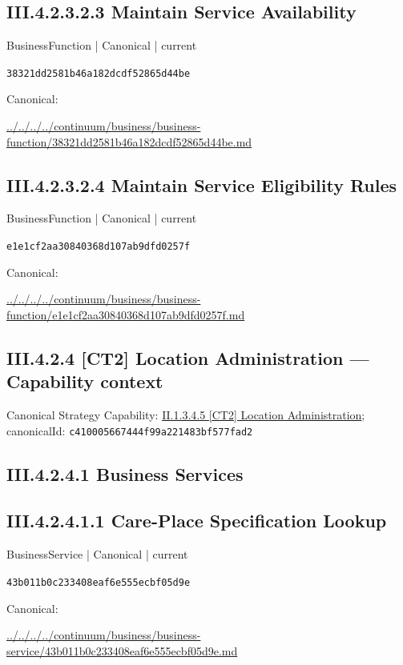\documentclass[10pt,a4paper]{article}
\begin{document}
\subsection*{III.4.2.3.2.3 Maintain Service Availability}
\label{element-38321dd2581b46a182dcdf52865d44be}
{\small BusinessFunction | Canonical | current}\par
\texttt{38321dd2581b46a182dcdf52865d44be}\par
Canonical: \par
{\footnotesize\url{../../../../continuum/business/business-function/38321dd2581b46a182dcdf52865d44be.md}}\par
\subsection*{III.4.2.3.2.4 Maintain Service Eligibility Rules}
\label{element-e1e1cf2aa30840368d107ab9dfd0257f}
{\small BusinessFunction | Canonical | current}\par
\texttt{e1e1cf2aa30840368d107ab9dfd0257f}\par
Canonical: \par
{\footnotesize\url{../../../../continuum/business/business-function/e1e1cf2aa30840368d107ab9dfd0257f.md}}\par
\subsection*{III.4.2.4 [CT2] Location Administration — Capability context}
Canonical Strategy Capability: \hyperref[element-c410005667444f99a221483bf577fad2]{II.1.3.4.5 [CT2] Location Administration}; canonicalId: \texttt{c410005667444f99a221483bf577fad2}\par
\subsection*{III.4.2.4.1 Business Services}
\subsection*{III.4.2.4.1.1 Care-Place Specification Lookup}
\label{element-43b011b0c233408eaf6e555ecbf05d9e}
{\small BusinessService | Canonical | current}\par
\texttt{43b011b0c233408eaf6e555ecbf05d9e}\par
Canonical: \par
{\footnotesize\url{../../../../continuum/business/business-service/43b011b0c233408eaf6e555ecbf05d9e.md}}\par
\end{document}
